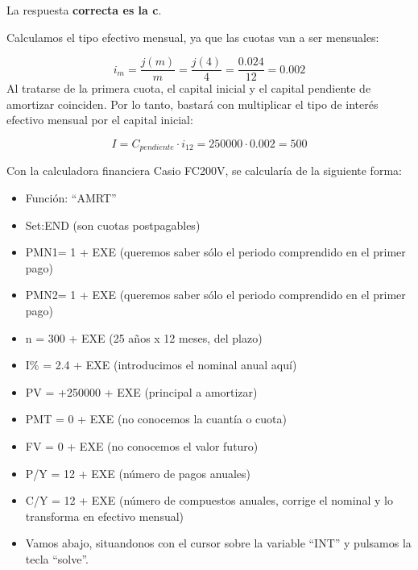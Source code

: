 \documentclass[
  letterpaper,
  DIV=11,
  numbers=noendperiod]{scrreprt}
\begin{document}
\begin{tcolorbox}[enhanced jigsaw, left=2mm, opacityback=0, colback=white, breakable, arc=.35mm, bottomrule=.15mm, rightrule=.15mm, toprule=.15mm, leftrule=.75mm, colframe=quarto-callout-tip-color-frame]
\begin{minipage}[t]{5.5mm}
\textcolor{quarto-callout-tip-color}{\faLightbulb}
\end{minipage}%
\begin{minipage}[t]{\textwidth - 5.5mm}

La respuesta \textbf{correcta es la c}.

Calculamos el tipo efectivo mensual, ya que las cuotas van a ser
mensuales:

\[i_m=\frac{j\left(m\right)}{m}=\frac{j\left(4\right)}{4}=\frac{0.024}{12}=0.002\]
Al tratarse de la primera cuota, el capital inicial y el capital
pendiente de amortizar coinciden. Por lo tanto, bastará con multiplicar
el tipo de interés efectivo mensual por el capital inicial:

\[I=C_{pendiente}\cdot i_{12}=250000\cdot0.002=500\]

Con la calculadora financiera Casio FC200V, se calcularía de la
siguiente forma:

\begin{itemize}
\item
  Función: ``AMRT''
\item
  Set:END (son cuotas postpagables)
\item
  PMN1= 1 + EXE (queremos saber sólo el periodo comprendido en el primer
  pago)
\item
  PMN2= 1 + EXE (queremos saber sólo el periodo comprendido en el primer
  pago)
\item
  n = 300 + EXE (25 años x 12 meses, del plazo)
\item
  I\% = 2.4 + EXE (introducimos el nominal anual aquí)
\item
  PV = +250000 + EXE (principal a amortizar)
\item
  PMT = 0 + EXE (no conocemos la cuantía o cuota)
\item
  FV = 0 + EXE (no conocemos el valor futuro)
\item
  P/Y = 12 + EXE (número de pagos anuales)
\item
  C/Y = 12 + EXE (número de compuestos anuales, corrige el nominal y lo
  transforma en efectivo mensual)
\item
  Vamos abajo, situandonos con el cursor sobre la variable ``INT'' y
  pulsamos la tecla ``solve''.
\end{itemize}


\end{minipage}
\end{tcolorbox}
\end{document}
